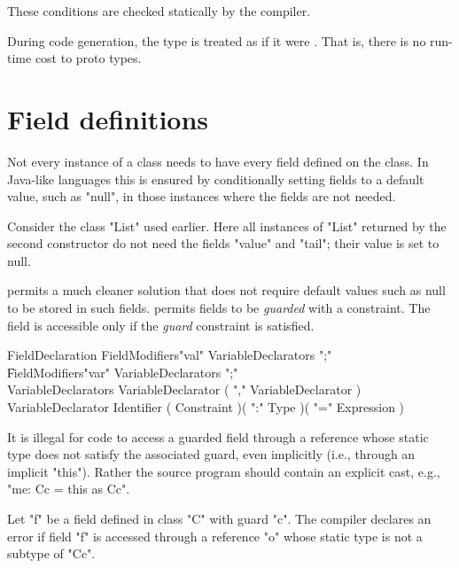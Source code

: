 These conditions are checked statically by the compiler. 

During code generation, the type  is treated as if it were
. That is, there is no run-time cost to proto types.


\section{Field definitions}

Not every instance of a class needs to have every field defined on the
class. In Java-like languages this is ensured by conditionally setting
fields to a default value, such as \xcd"null", in those instances where the
fields are not needed.  

Consider the class \xcd"List" used earlier.  Here all instances of \xcd"List"
returned by the second constructor do not need the fields \xcd"value" and
\xcd"tail"; their value is set to null.

\label{FieldGuard}

\Xten{} permits a much cleaner solution that does not require default
values such as null to be stored in such fields. \Xten{} permits fields to
be {\em guarded} with a constraint.  The field is accessible
only if the \emph{guard} constraint is satisfied.

\begin{grammar}
FieldDeclaration  \:
   FieldModifiers\opt \xcd"val" VariableDeclarators \xcd";" \\
   \|
   FieldModifiers\opt \xcd"var" VariableDeclarators \xcd";" \\
VariableDeclarators \:
        VariableDeclarator ( \xcd"," VariableDeclarator )\star \\
VariableDeclarator \:
   Identifier ( Constraint )\opt ( \xcd":" Type )\opt ( \xcd"=" Expression )\opt \\
\end{grammar}

It is illegal for code to access a guarded field through a reference
whose static type does not satisfy the associated guard, even
implicitly (i.e., through an implicit \xcd"this"). Rather the source
program should contain an explicit cast, e.g., \xcd"me: C{c} = this as C{c}".

\begin{staticrule*}
Let \xcd"f" be a field defined in class
\xcd"C" with guard \xcd"c".  The compiler declares an error if
field \xcd"f" is accessed through a reference \xcd"o" whose static
type is not a subtype of \xcd"C{c}".
\end{staticrule*}

